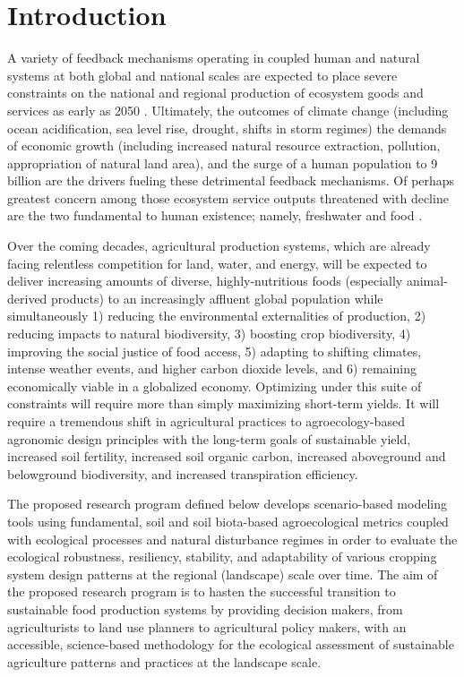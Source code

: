 \section{Introduction}
A variety of feedback mechanisms operating in coupled human and natural systems at both global and national scales are expected to place severe constraints on the national and regional production of ecosystem goods and services as early as 2050 \citep{zhao_drought-induced_2010, hoegh-guldberg_impact_2010, eigenbrod_impact_2011}. Ultimately, the outcomes of climate change (including ocean acidification, sea level rise, drought, shifts in storm regimes) the demands of economic growth (including increased natural resource extraction, pollution, appropriation of natural land area), and the surge of a human population to 9 billion are the drivers fueling these detrimental feedback mechanisms. Of perhaps greatest concern among those ecosystem service outputs threatened with decline are the two fundamental to human existence; namely, freshwater and food \citep{dodds_human_2013, rogers_facing_2008, lobell_climate_2011, wada_global_2010, zhao_drought-induced_2010, schmidhuber_global_2007, tilman_forecasting_2001, tilman_agricultural_2002}. 

Over the coming decades, agricultural production systems, which are already facing relentless competition for land, water, and energy, will be expected to deliver increasing amounts of diverse, highly-nutritious foods (especially animal-derived products) to an increasingly affluent global population while simultaneously 1) reducing the environmental externalities of production, 2) reducing impacts to natural biodiversity, 3) boosting crop biodiversity, 4) improving the social justice of food access, 5) adapting to shifting climates, intense weather events, and higher carbon dioxide levels, and 6) remaining economically viable in a globalized economy. Optimizing under this suite of constraints will require more than simply maximizing short-term yields. It will require a tremendous shift in agricultural practices to agroecology-based agronomic design principles with the long-term goals of sustainable yield, increased soil fertility, increased soil organic carbon, increased aboveground and belowground biodiversity, and increased transpiration efficiency.

The proposed research program defined below develops scenario-based modeling tools using fundamental, soil and soil biota-based agroecological metrics coupled with ecological processes and natural disturbance regimes in order to evaluate the ecological robustness, resiliency, stability, and adaptability of various cropping system design patterns at the regional (landscape) scale over time. The aim of the proposed research program is to hasten the successful transition to sustainable food production systems by providing decision makers, from agriculturists to land use planners to agricultural policy makers, with an accessible, science-based methodology for the ecological assessment of sustainable agriculture patterns and practices at the landscape scale.  



